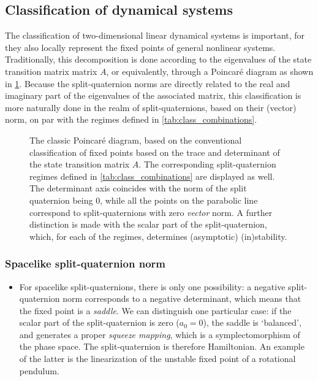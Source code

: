 \subsection{Classification of dynamical systems}
The classification of two-dimensional linear dynamical systems is important, for they also locally represent the fixed points of general nonlinear systems. Traditionally, this decomposition is done according to the eigenvalues of the state transition matrix matrix $A$, or equivalently, through a Poincaré diagram as shown in \cref{fig:poincare_diagram}. Because the split-quaternion norms are directly related to the real and imaginary part of the eigenvalues of the associated matrix, this classification is more naturally done in the realm of split-quaternions, based on their (vector) norm, on par with the regimes defined in \cref{tab:class_combinations}.
\begin{figure}[h!]
    \centering
    
    \caption{The classic Poincaré diagram, based on the conventional classification of fixed points based on the trace and determinant of the state transition matrix $A$. The corresponding split-quaternion regimes defined in \cref{tab:class_combinations} are displayed as well. The determinant axis coincides with the norm of the split quaternion being 0, while all the points on the parabolic line correspond to split-quaternions with zero \emph{vector} norm. A further distinction is made with the scalar part of the split-quaternion, which, for each of the regimes, determines (asymptotic) (in)stability.}
    \label{fig:poincare_diagram}
\end{figure}

\subsubsection*{Spacelike split-quaternion norm}
    \begin{itemize}
        \item[\circled{1}] For spacelike split-quaternions, there is only one possibility: a negative split-quaternion norm corresponds to a negative determinant, which means that the fixed point is a \emph{saddle}. We can distinguish one particular case: if the scalar part of the split-quaternion is zero ($a_0 = 0$), the saddle is `balanced', and generates a proper \emph{squeeze mapping}, which is a symplectomorphism of the phase space. The split-quaternion is therefore Hamiltonian. An example of the latter is the linearization of the unstable fixed point of a rotational pendulum.
    \end{itemize}

